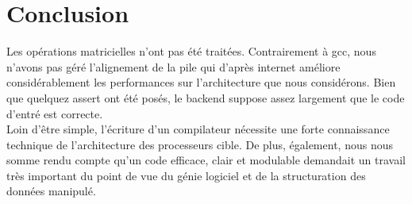 \documentclass[a4paper, 11pt]{article}
\begin{document}
\section{Conclusion}

Les opérations matricielles n'ont pas été traitées. Contrairement à gcc, nous n'avons pas géré l'alignement de la pile qui d'après internet
améliore considérablement les performances sur l'architecture que nous considérons. Bien que quelquez assert ont été posés, le backend 
suppose assez largement que le code d'entré est correcte.\\

Loin d'être simple, l'écriture d'un compilateur nécessite une forte connaissance technique de l'architecture des processeurs cible. De plus, 
également, nous nous somme rendu compte qu'un code efficace, clair et modulable demandait un travail très important du point de vue du
génie logiciel et de la structuration des données manipulé.
\end{document}
